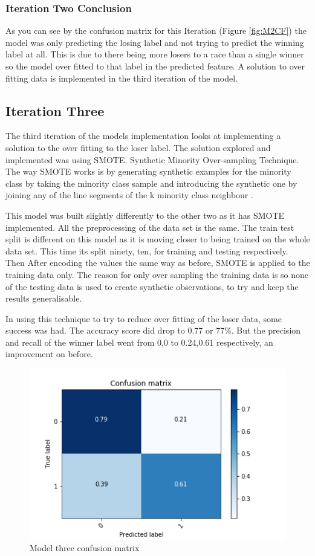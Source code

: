 \subsubsection{Iteration Two Conclusion}
As you can see by the confusion matrix for this Iteration (Figure \ref{fig:M2CF}) the model was only predicting the losing label and not trying to predict the winning label at all. This is due to there being more losers to a race than a single winner so the model over fitted to that label in the predicted feature. A solution to over fitting data is implemented in the third iteration of the model. 

\subsection{Iteration Three}
The third iteration of the models implementation looks at implementing a solution to the over fitting to the loser label. The solution explored and implemented was using SMOTE. Synthetic Minority Over-sampling Technique. The way SMOTE works is by generating synthetic examples for the minority class by taking the minority class sample and introducing the synthetic one by joining any of the line segments of the k minority class neighbour \cite{SMOTE}.

This model was built slightly differently to the other two as it has SMOTE implemented. All the preprocessing of the data set is the same. The train test split is different on this model as it is moving closer to being trained on the whole data set. This time its split ninety, ten, for training and testing respectively. Then After encoding the values the same way as before, SMOTE is applied to the training data only. The reason for only over sampling the training data is so none of the testing data is used to create synthetic observations, to try and keep the results generalisable.

In using this technique to try to reduce over fitting of the loser data, some success was had. The accuracy score did drop to 0.77 or 77\%. But the precision and recall of the winner label went from 0,0 to 0.24,0.61 respectively, an improvement on before.
\begin{figure}[h!]
  \centering
  \includegraphics[width = (\textwidth)/2]{confusionMatrix.png}
  \caption{Model three confusion matrix}
  \label{fig:M3CF}
\end{figure}
